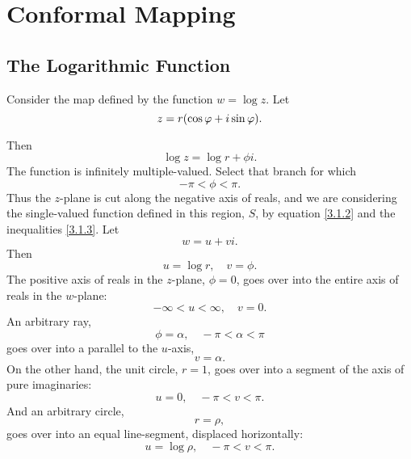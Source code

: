 \documentclass[twosided]{memoir}
\begin{document}
\chapter{Conformal Mapping}
\section{The Logarithmic Function}
Consider the map defined by the function $w=\log z$. Let
\begin{equation}
	z=r\pbr*{\cos \phi +i\sin \phi }.
\end{equation}

Then
\begin{equation}\label{3.1.2}
\log z=\log r+\phi i.
\end{equation}
The function is infinitely multiple-valued. Select that branch for which
\begin{equation}\label{3.1.3}
-\pi <\phi <\pi.
\end{equation}
Thus the $z$-plane is cut along the negative axis of reals, and we are considering the single-valued function defined in this region, $S$, by equation \ref{3.1.2} and the inequalities \ref{3.1.3}. Let
\[
w=u+vi
.\] Then
\begin{equation}\label{3.1.4}
u=\log r, \quad v=\phi.
\end{equation}
The positive axis of reals in the $z$-plane, $\phi =0$, goes over into the entire axis of reals in the $w$-plane:
\begin{equation}\label{3.1.5}
-\infty<u<\infty, \quad v=0.
\end{equation}
An arbitrary ray,
\begin{equation}\label{3.1.6}
\phi =\alpha ,\quad -\pi <\alpha <\pi
\end{equation}
goes over into a parallel to the $u$-axis,
\begin{equation}\label{3.1.7}
v=\alpha .
\end{equation}
On the other hand, the unit circle, $r=1$, goes over into a segment of the axis of pure imaginaries:
\begin{equation}\label{3.1.8}
u=0, \quad -\pi <v<\pi.
\end{equation}
And an arbitrary circle,
\begin{equation}\label{3.1.9}
r=\rho,
\end{equation}
goes over into an equal line-segment, displaced horizontally:
\begin{equation}\label{3.1.10}
u=\log \rho ,\quad -\pi <v<\pi.
\end{equation}
\end{document}
